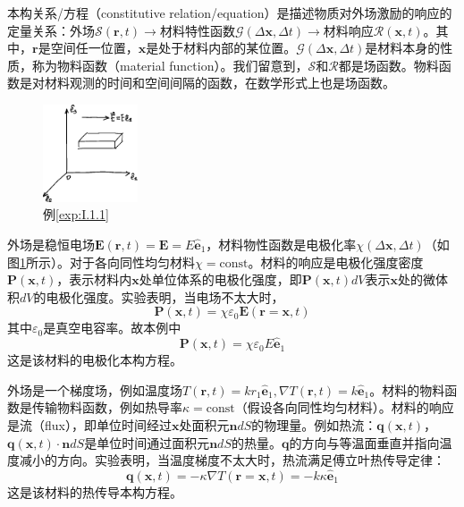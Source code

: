 \documentclass[main.tex]{subfiles}
\begin{document}
本构关系/方程（constitutive relation/equation）是描述物质对外场激励的响应的定量关系：外场$\mathcal{S}\left(\mathbf{r},t\right)\rightarrow$材料特性函数$\mathcal{G}\left(\Delta\mathbf{x},\Delta t\right)\rightarrow$材料响应$\mathcal{R}\left(\mathbf{x},t\right)$。其中，$\mathbf{r}$是空间任一位置，$\mathbf{x}$是处于材料内部的某位置。$\mathcal{G}\left(\Delta\mathbf{x},\Delta t\right)$是材料本身的性质，称为物料函数（material function）。我们留意到，$\mathcal{S}$和$\mathcal{R}$都是场函数。物料函数是对材料观测的时间和空间间隔的函数，在数学形式上也是场函数\cite[\S~9.7,p.192]{华工高数2009下}。

\begin{figure}[h]
\centering
\includegraphics[width=0.25\textwidth]{images/I.1.2.eps}
\caption{例\ref{exp:I.1.1}}
\label{fig:I.1.2}
\end{figure}

\begin{example}\label{exp:I.1.1}
外场是稳恒电场$\mathbf{E}\left(\mathbf{r},t\right)=\mathbf{E}=E\mathbf{\hat{e}}_1$，材料物性函数是电极化率$\chi\left(\Delta\mathbf{x},\Delta t\right)$（如图\ref{fig:I.1.2}所示）。对于各向同性均匀材料$\chi=\text{const}$。材料的响应是电极化强度密度$\mathbf{P}\left(\mathbf{x},t\right)$，表示材料内$\mathbf{x}$处单位体系的电极化强度，即$\mathbf{P}\left(\mathbf{x},t\right)dV$表示$\mathbf{x}$处的微体积$dV$的电极化强度。实验表明，当电场不太大时\cite[\S18.2.3,p.~57]{邓文基2009大物下}，
\[
\mathbf{P}\left(\mathbf{x},t\right)=\chi\varepsilon_0\mathbf{E}\left(\mathbf{r}=\mathbf{x},t\right)
\]
其中$\varepsilon_0$是真空电容率。故本例中
\[
\mathbf{P}\left(\mathbf{x},t\right)=\chi\varepsilon_0 E\mathbf{\hat{e}}_1
\]
这是该材料的电极化本构方程。
\end{example}

\begin{example}\label{exp:I.1.2}
外场是一个梯度场，例如温度场$T\left(\mathbf{r},t\right)=kr_1\mathbf{\hat{e}}_1,\nabla T\left(\mathbf{r},t\right)=k\mathbf{\hat{e}}_1$。材料的物料函数是传输物料函数，例如热导率$\kappa=\text{const}$（假设各向同性均匀材料）。材料的响应是流（flux），即单位时间经过$\mathbf{x}$处面积元$\mathbf{n}dS$的物理量。例如热流：$\mathbf{q}\left(\mathbf{x},t\right)$，$\mathbf{q}\left(\mathbf{x},t\right)\cdot\mathbf{n}dS$是单位时间通过面积元$\mathbf{n}dS$的热量。$\mathbf{q}$的方向与等温面垂直并指向温度减小的方向。实验表明，当温度梯度不太大时，热流满足傅立叶热传导定律\cite[\S1.1.3.1,p.~9]{钟理化工原理上册2008}：
\[
\mathbf{q}\left(\mathbf{x},t\right)=-\kappa\nabla T\left(\mathbf{r}=\mathbf{x},t\right)=-k\kappa\mathbf{\hat{e}}_1
\]
这是该材料的热传导本构方程。
\end{example}
\end{document}
